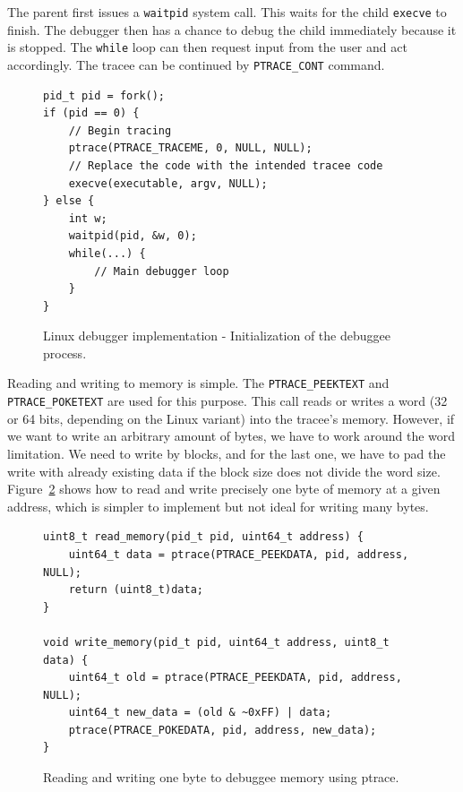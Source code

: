 The parent first issues a \texttt{waitpid} system call. This waits for the
child \texttt{execve} to finish. The debugger then has a chance to debug the
child immediately because it is stopped. The \texttt{while} loop can then
request input from the user and act accordingly. The tracee can be continued by
\texttt{PTRACE\_CONT} command.

\begin{figure}
    \begin{verbatim}
pid_t pid = fork();
if (pid == 0) {
    // Begin tracing
    ptrace(PTRACE_TRACEME, 0, NULL, NULL);
    // Replace the code with the intended tracee code
    execve(executable, argv, NULL);
} else {
    int w;
    waitpid(pid, &w, 0);
    while(...) {
        // Main debugger loop
    }
}
    \end{verbatim}
    \caption{Linux debugger implementation - Initialization of the debuggee
    process.}
    \label{fig:debugger-init}
\end{figure}

Reading and writing to memory is simple. The \texttt{PTRACE\_PEEKTEXT} and
\texttt{PTRACE\_POKETEXT} are used for this purpose. This call reads or writes
a word (32 or 64 bits, depending on the Linux variant) into the tracee's
memory. However, if we want to write an arbitrary amount of bytes, we have to
work around the word limitation. We need to write by blocks, and for the last
one, we have to pad the write with already existing data if the block size does
not divide the word size. Figure~\ref{fig:write-read} shows how to read and
write precisely one byte of memory at a given address, which is simpler to
implement but not ideal for writing many bytes.

\begin{figure}
    \begin{verbatim}
uint8_t read_memory(pid_t pid, uint64_t address) {
    uint64_t data = ptrace(PTRACE_PEEKDATA, pid, address, NULL);
    return (uint8_t)data;
}

void write_memory(pid_t pid, uint64_t address, uint8_t data) {
    uint64_t old = ptrace(PTRACE_PEEKDATA, pid, address, NULL);
    uint64_t new_data = (old & ~0xFF) | data;
    ptrace(PTRACE_POKEDATA, pid, address, new_data);
}
    \end{verbatim}
    \caption{Reading and writing one byte to debuggee memory using ptrace.}
    \label{fig:write-read}
\end{figure}

